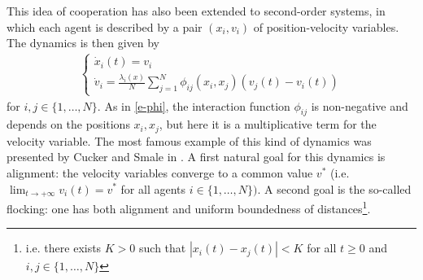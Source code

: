\documentclass[journal]{article}
\begin{document}
This idea of cooperation has also been extended to second-order systems, in which each agent is described by a pair $(x_i,v_i)$ of position-velocity variables. The dynamics is then given by 
\begin{eqnarray}\label{e-ODE-2nd-noM}
\begin{cases}
    \dot{x}_i(t) = v_i\\
\dot v_i=    \frac{\lambda_i(x)}{N}\sum_{j=1}^{N} \phi_{ij}(x_i,x_j) (v_j(t) - v_i(t))
\end{cases} 
\end{eqnarray}
for $ i,j \in\{1,\ldots,N\}$. As in \eqref{e-phi}, the interaction function $\phi_{ij}$ is non-negative and depends on the positions $x_i,x_j$, but here it is a multiplicative term for the velocity variable. The most famous example of this kind of dynamics was presented by Cucker and Smale in \cite{CS}. A first natural goal for this dynamics is alignment: the velocity variables converge to a common value $v^*$ (i.e. $\lim_{t\to +\infty} v_i(t)=v^*$ for all agents $i \in \{1,\ldots,N\})$. A second goal is the so-called flocking: one has both alignment and uniform boundedness of distances\footnote{i.e. there exists $K>0$ such that $|x_i(t)-x_j(t)|< K$ for all $t\geq 0$ and $i,j \in \{1,\ldots,N\}$}.\\
\end{document}
